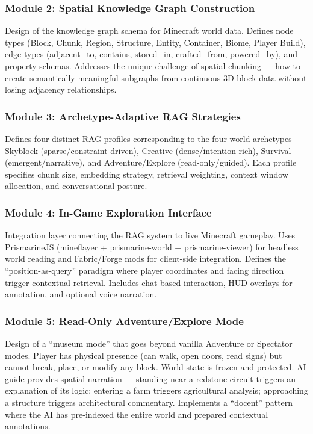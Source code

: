 \documentclass[11pt,letterpaper]{article}
\begin{document}
\subsubsection{Module 2: Spatial Knowledge Graph Construction}
Design of the knowledge graph schema for Minecraft world data. Defines node types (Block, Chunk, Region, Structure, Entity, Container, Biome, Player Build), edge types (adjacent\_to, contains, stored\_in, crafted\_from, powered\_by), and property schemas. Addresses the unique challenge of spatial chunking --- how to create semantically meaningful subgraphs from continuous 3D block data without losing adjacency relationships.

\subsubsection{Module 3: Archetype-Adaptive RAG Strategies}
Defines four distinct RAG profiles corresponding to the four world archetypes --- Skyblock (sparse/constraint-driven), Creative (dense/intention-rich), Survival (emergent/narrative), and Adventure/Explore (read-only/guided). Each profile specifies chunk size, embedding strategy, retrieval weighting, context window allocation, and conversational posture.

\subsubsection{Module 4: In-Game Exploration Interface}
Integration layer connecting the RAG system to live Minecraft gameplay. Uses PrismarineJS (mineflayer + prismarine-world + prismarine-viewer) for headless world reading and Fabric/Forge mods for client-side integration. Defines the ``position-as-query'' paradigm where player coordinates and facing direction trigger contextual retrieval. Includes chat-based interaction, HUD overlays for annotation, and optional voice narration.

\subsubsection{Module 5: Read-Only Adventure/Explore Mode}
Design of a ``museum mode'' that goes beyond vanilla Adventure or Spectator modes. Player has physical presence (can walk, open doors, read signs) but cannot break, place, or modify any block. World state is frozen and protected. AI guide provides spatial narration --- standing near a redstone circuit triggers an explanation of its logic; entering a farm triggers agricultural analysis; approaching a structure triggers architectural commentary. Implements a ``docent'' pattern where the AI has pre-indexed the entire world and prepared contextual annotations.
\end{document}
